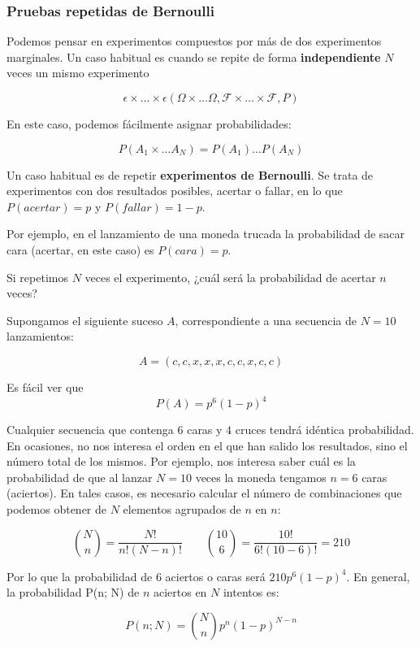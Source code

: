 \documentclass[11pt]{article}
\begin{document}
    \subsubsection*{Pruebas repetidas de
Bernoulli}\label{pruebas-repetidas-de-bernoulli}

Podemos pensar en experimentos compuestos por más de dos experimentos
marginales. Un caso habitual es cuando se repite de forma
\textbf{independiente} \(N\) veces un mismo experimento

\[\epsilon \times \ldots \times \epsilon (\Omega \times\ldots \Omega, \mathscr{F}\times \ldots \times \mathscr{F}, P)\]

En este caso, podemos fácilmente asignar probabilidades:

\[P(A_1 \times \ldots A_N) = P(A_1)\ldots P(A_N)\]

Un caso habitual es de repetir \textbf{experimentos de Bernoulli}. Se
trata de experimentos con dos resultados posibles, acertar o fallar, en
lo que \(P(acertar)=p\) y \(P(fallar)=1-p\).

    Por ejemplo, en el lanzamiento de una moneda trucada la probabilidad de
sacar cara (acertar, en este caso) es \(P(cara)=p\).

Si repetimos \(N\) veces el experimento, ¿cuál será la probabilidad de
acertar \(n\) veces?

Supongamos el siguiente suceso \(A\), correspondiente a una secuencia de
\(N=10\) lanzamientos:

\[A=(c,c,x,x,x,c,c,x,c, c)\]

Es fácil ver que \[P(A)=p^6(1-p)^4\]

    Cualquier secuencia que contenga \(6\) caras y \(4\) cruces tendrá
idéntica probabilidad. En ocasiones, no nos interesa el orden en el que
han salido los resultados, sino el número total de los mismos. Por
ejemplo, nos interesa saber cuál es la probabilidad de que al lanzar
\(N=10\) veces la moneda tengamos \(n=6\) caras (aciertos). En tales
casos, es necesario calcular el número de combinaciones que podemos
obtener de \(N\) elementos agrupados de \(n\) en \(n\):

\[\binom{N}{n} = \frac{N!}{n!(N-n)!} \qquad \binom{10}{6} = \frac{10!}{6!(10-6)!}=210\]

Por lo que la probabilidad de \(6\) aciertos o caras será
\(210 p^6(1-p)^4\). En general, la probabilidad P(n; N) de \(n\)
aciertos en \(N\) intentos es:

\[P(n;N) = \binom{N}{n}p^n(1-p)^{N-n}\]
\end{document}
